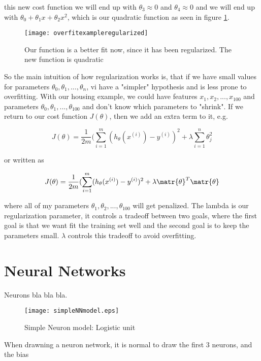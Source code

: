this new cost function we will end up with $\theta_3 \approx 0$ and $\theta_4 \approx 0$ and we will end up with $\theta_0 + \theta_1x + \theta_2x^2$, which is our quadratic function as seen in figure \ref{fig:app:overfitexampleregularized}.

\begin{figure}[H]
  \centering
  \texttt{[image: overfitexampleregularized]}
  \caption{Our function is a better fit now, since it has been regularized. The new function is quadratic}\label{fig:app:overfitexampleregularized}
\end{figure}

So the main intuition of how regularization works is, that if we have small values for parameters $\theta_0, \theta_1, ... ,\theta_n$, vi have a "simpler" hypothesis and is less prone to overfitting.
With our housing example, we could have features $x_1, x_2, ... , x_100$ and parameters $\theta_0, \theta_1, ... , \theta_{100}$ and don't know which parameters to "shrink". If we return to our cost function $J(\theta)$, then we add an extra term to it, e.g.

\[
  J(\theta) = \frac{1}{2m}(\sum_{i=1}^{m}(h_\theta(x^{(i)})-y^{(i)})^2 + \lambda \sum_{i=1}^{n} \theta_j^2
\]

or written as

\[
  J(\theta) = \frac{1}{2m}(\sum_{i=1}^{m}(h_\theta(x^{(i)})-y^{(i)})^2 + \lambda \matr{\theta}^T\matr{\theta}
\]

where all of my parameters $\theta_1, \theta_2, ... , \theta_{100}$ will get penalized. The lambda is our regularization parameter, it controls a tradeoff between two goals, where the first goal is that we want fit the training set well and the second goal is to keep the parameters small. $\lambda$ controls this tradeoff to avoid overfitting.

\section{Neural Networks}

Neurons bla bla bla.

\begin{figure}[H]
  \centering
  \texttt{[image: simpleNNmodel.eps]}
  \caption{Simple Neuron model: Logistic unit}\label{fig:app:simpleNNmodel}
\end{figure}

When drawning a neuron network, it is normal to draw the first 3 neurons, and the bias

